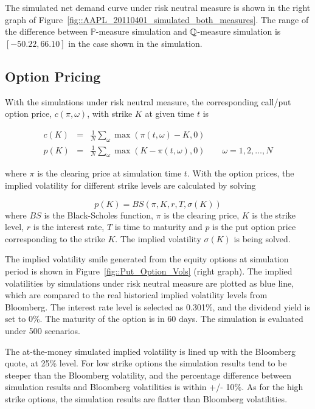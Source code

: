 \documentclass{article}
\begin{document}
The simulated net demand curve under risk neutral measure is shown in the
right graph of Figure~\ref{fig::AAPL_20110401_simulated_both_measures}. The
range of the difference between $\mathbb{P}$-measure simulation and $\mathbb{%
Q}$-measure simulation is $[-50.22, 66.10]$ in the case shown in the
simulation.

\subsection{Option Pricing}

With the simulations under risk neutral measure, the corresponding call/put
option price, $c(\pi, \omega)$, with strike $K$ at given time $t$ is

\begin{eqnarray*}
c(K) &=& \frac{1}{N} \sum_{\omega} \max\left(\pi(t,\omega)-K,0\right) \\
p(K) &=& \frac{1}{N} \sum_{\omega} \max\left(K - \pi(t,\omega),0\right)
\qquad \omega = 1,2,\ldots,N
\end{eqnarray*}

where $\pi$ is the clearing price at simulation time $t$. With the option
prices, the implied volatility for different strike levels are calculated by
solving

\begin{equation*}
p(K)=BS(\pi ,K,r,T,\sigma (K))
\end{equation*}%
where $BS$ is the Black-Scholes function, $\pi $ is the clearing price, $K$
is the strike level, $r$ is the interest rate, $T$ is time to maturity and $%
p $ is the put option price corresponding to the strike $K$. The implied
volatility $\sigma (K)$ is being solved.

The implied volatility smile generated from the equity options at simulation
period is shown in Figure~\ref{fig::Put_Option_Vols} (right graph). The
implied volatilities by simulations under risk neutral measure are plotted
as blue line, which are compared to the real historical implied volatility
levels from Bloomberg. The interest rate level is selected as 0.301\%, and
the dividend yield is set to 0\%. The maturity of the option is in 60 days.
The simulation is evaluated under 500 scenarios.

The at-the-money simulated implied volatility is lined up with the Bloomberg
quote, at 25\% level. For low strike options the simulation results tend to
be steeper than the Bloomberg volatility, and the percentage difference
between simulation results and Bloomberg volatilities is within +/- 10\%. As
for the high strike options, the simulation results are flatter than
Bloomberg volatilities.
\end{document}
